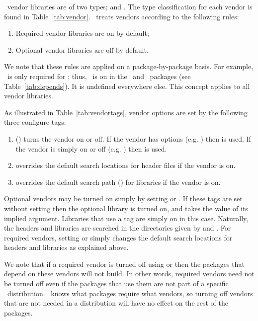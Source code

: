 \draco\ vendor libraries are of two types;  and
.  The type classification for each vendor is found in
Table~\ref{tab:vendor}.  \draco\ treats vendors according to the
following rules:
\begin{enumerate}
\item Required vendor libraries are on by default;
\item Optional vendor libraries are off by default.
\end{enumerate}
We note that these rules are applied on a package-by-package basis.
For example, \sprng\ is only required for \rng; thus, \sprng\ is on in
the \rng\ and \imc\ packages (see Table~\ref{tab:depends}).  It is
undefined everywhere else.  This concept applies to all vendor
libraries.

As illustrated in Table~\ref{tab:vendortags}, vendor options are set
by the following three configure tags:
\begin{enumerate}
\item {} ()
  turns the vendor on or off.  If the vendor has options (e.g.
  ) then  is used.  If the vendor is
  simply on or off (e.g.  ) then 
  is used.
\item {} overrides the default 
  search locations for header files if the vendor is on.
\item {} overrides the default search
  path (\ldlib) for libraries if the vendor is on.
\end{enumerate}
Optional vendors may be turned on simply by setting
 or .
If these tags are set without setting  then
the optional library is turned on, and 
takes the value of its implied argument.  Libraries that use a
 tag are simply on in this case.  Naturally, the
headers and libraries are searched in the directories given by
 and .
For required vendors, setting  or
 simply changes the default search
locations for headers and libraries as explained above.

We note that if a required vendor is turned off using
 or  then
the packages that depend on these vendors will not build.  In other
words, required vendors need not be turned off even if the packages
that use them are not part of a specific \draco\ distribution.
\draco\ knows what packages require what vendors, so turning off
vendors that are not needed in a distribution will have no effect on
the rest of the packages.

